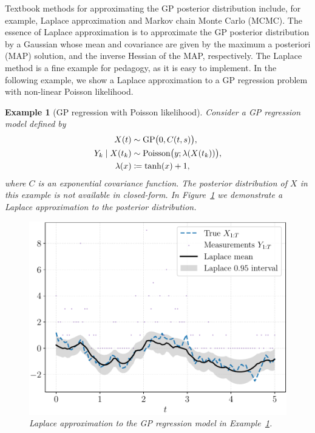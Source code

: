 \documentclass[]{article}
\newtheorem{example}[theorem]{Example}
\begin{document}
Textbook methods for approximating the GP posterior distribution include, for example, Laplace approximation and Markov chain Monte Carlo (MCMC). The essence of Laplace approximation is to approximate the GP posterior distribution by a Gaussian whose mean and covariance are given by the maximum a posteriori (MAP) solution, and the inverse Hessian of the MAP, respectively. The Laplace method is a fine example for pedagogy, as it is easy to implement. In the following example, we show a Laplace approximation to a GP regression problem with non-linear Poisson likelihood.

\begin{example}[GP regression with Poisson likelihood]
	\label{example:gp-poisson}
	Consider a GP regression model defined by
	\begin{equation*}
		\begin{split}
			X(t) &\sim \mathrm{GP}\bigl(0, C(t, s)\bigr), \\
			Y_k {\;|\;} X(t_k) &\sim \mathrm{Poisson}\bigl(y; \lambda(X(t_k))\bigr),\\
			\lambda(x) &\coloneqq \tanh(x) + 1,
		\end{split}
	\end{equation*}
	where $C$ is an exponential covariance function. The posterior distribution of $X$ in this example is not available in closed-form. In Figure~\ref{fig:poisson-gp} we demonstrate a Laplace approximation to the posterior distribution.
	\begin{figure}[t!]
		\centering
		\includegraphics[width=.8\linewidth]{figs/poisson-gp}
		\caption{Laplace approximation to the GP regression model in Example~\ref{example:gp-poisson}.}
		\label{fig:poisson-gp}
	\end{figure}
\end{example}
\end{document}
